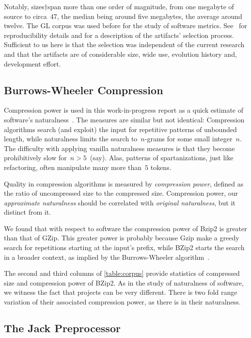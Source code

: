 Notably, sizes†span more than one
order of magnitude, from one megabyte of source to circa~47, the median being
around five megabytes, the average around twelve. The GL corpus was used before
for the study of software metrics.  See~\cite{Gil:Lalouche:16,Gil:Lalouche:16b}
for reproducibility details and for a description of the artifacts' selection
process. Sufficient to us here is that the selection was independent of the
current research and that the artifacts are of considerable size, wide use,
evolution history and, development effort.

\subsection{Burrows-Wheeler Compression}
Compression power is used in this work-in-progress report as a quick estimate
of software's naturalness~\cite{Hindle:Bar:Su:Gabel:Devanbu:12}. The measures
are similar but not identical: Compression algorithms search (and exploit) the
input for repetitive patterns of unbounded length, while naturalness limits the
search to~$n$-grams for some small integer~$n$. The difficulty with applying
vanilla naturalness measures is that they become prohibitively slow
for~$n>5$~(say). Alas, patterns of spartanizations, just like refactoring,
often manipulate many more than~$5$ tokens.

Quality in compression algorithms is measured by \emph{compression power},
defined as the ratio of uncompressed size to the compressed size. Compression
power, our \emph{approximate naturalness} should be correlated with
\emph{original naturalness}, but it distinct from it.

We found that with respect to \Java software the compression power of Bzip2 is
greater than that of GZip. This greater power is probably because Gzip make a
greedy search for repetitions starting at the input's prefix, while BZip2
starts the search in a broader context, as implied by the Burrows-Wheeler
algorithm~\cite{Burrows:Wheeler:94}.

The second and third columns of \cref{table:corpus} provide statistics of
compressed size and compression power of BZip2. As in
the study of naturalness of software, we witness the fact that projects can be
very different. There is two fold range variation of their associated
compression power, as there is in their naturalness.

\subsection{The Jack Preprocessor}

